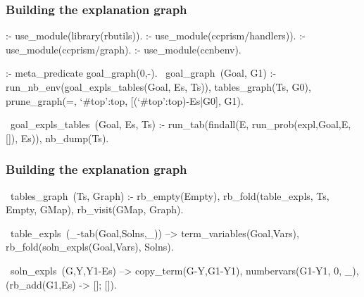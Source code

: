 \documentclass[usenames,dvipsnames]{beamer}
\newenvironment{isframe}[1][untitled]{\begin{frame}[fragile=singleslide,environment=isframe]\frametitle{#1}}{\end{frame}}
\begin{document}
\begin{isframe}[Building the explanation graph]
\begin{prolog}[xleftmargin=0em,basicstyle=\small]
	:- use_module(library(rbutils)).
	:- use_module(ccprism/handlers)).
	:- use_module(ccprism/graph).
	:- use_module(ccnbenv).

	:- meta_predicate goal_graph(0,-).
	~goal_graph~(Goal, G1) :-
     run_nb_env(goal_expls_tables(Goal, Es, Ts)),
		 tables_graph(Ts, G0),
		 prune_graph(=, `#top':top, [(`#top':top)-Es|G0], G1).

  ~goal_expls_tables~(Goal, Es, Ts) :- 
    run_tab(findall(E, run_prob(expl,Goal,E,[]), Es)), 
    nb_dump(Ts).
\end{prolog}
\end{isframe}

\begin{isframe}[Building the explanation graph]
\begin{prolog}[xleftmargin=0em,basicstyle=\small]
	~tables_graph~(Ts, Graph) :-
		 rb_empty(Empty),
		 rb_fold(table_expls, Ts, Empty, GMap),
		 rb_visit(GMap, Graph).

	~table_expls~(_-tab(Goal,Solns,_)) -->
		 {term_variables(Goal,Vars)},
		 rb_fold(soln_expls(Goal,Vars), Solns).

	~soln_expls~(G,Y,Y1-Es) -->
		 {copy_term(G-Y,G1-Y1), numbervars(G1-Y1, 0, _)},
		 (rb_add(G1,Es) -> []; []).
\end{prolog}
\end{isframe}
\end{document}
